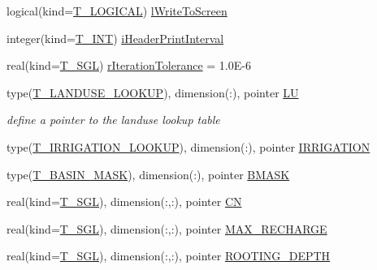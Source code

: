 \begin{DoxyCompactItemize}
logical(kind=\hyperlink{namespacetest_acdeac586276a7d1d394fb5eddc77fc3d}{T\_\-LOGICAL}) \hyperlink{typetest_1_1_t___m_o_d_e_l___c_o_n_f_i_g_u_r_a_t_i_o_n_ad06c7b3ed0928b93d283998b6da8438f}{lWriteToScreen}
\item 
integer(kind=\hyperlink{namespacetest_a6f91ebd89b58cfcc5da99faed9385c1e}{T\_\-INT}) \hyperlink{typetest_1_1_t___m_o_d_e_l___c_o_n_f_i_g_u_r_a_t_i_o_n_a142f03fa1eb88edd013259ce111abdc6}{iHeaderPrintInterval}
\item 
real(kind=\hyperlink{namespacetest_a04d8b9090502de3a00046fe904bc3d99}{T\_\-SGL}) \hyperlink{typetest_1_1_t___m_o_d_e_l___c_o_n_f_i_g_u_r_a_t_i_o_n_aac119edf2f75f0db18a4dc4860cc5c19}{rIterationTolerance} = 1.0E-\/6
\item 
type(\hyperlink{typetest_1_1_t___l_a_n_d_u_s_e___l_o_o_k_u_p}{T\_\-LANDUSE\_\-LOOKUP}), dimension(:), pointer \hyperlink{typetest_1_1_t___m_o_d_e_l___c_o_n_f_i_g_u_r_a_t_i_o_n_a2d94c6dd1c8fee154efbcd35a24f8763}{LU}
\begin{DoxyCompactList}\small\item\em define a pointer to the landuse lookup table \item\end{DoxyCompactList}\item 
type(\hyperlink{typetest_1_1_t___i_r_r_i_g_a_t_i_o_n___l_o_o_k_u_p}{T\_\-IRRIGATION\_\-LOOKUP}), dimension(:), pointer \hyperlink{typetest_1_1_t___m_o_d_e_l___c_o_n_f_i_g_u_r_a_t_i_o_n_a1420e3cbe2e7b347a5519cee404a404e}{IRRIGATION}
\item 
type(\hyperlink{typetest_1_1_t___b_a_s_i_n___m_a_s_k}{T\_\-BASIN\_\-MASK}), dimension(:), pointer \hyperlink{typetest_1_1_t___m_o_d_e_l___c_o_n_f_i_g_u_r_a_t_i_o_n_a0d55d3a1531a2bec8c7187266c9c521d}{BMASK}
\item 
real(kind=\hyperlink{namespacetest_a04d8b9090502de3a00046fe904bc3d99}{T\_\-SGL}), dimension(:,:), pointer \hyperlink{typetest_1_1_t___m_o_d_e_l___c_o_n_f_i_g_u_r_a_t_i_o_n_aa5d2dbec2d279ed153946089830a651e}{CN}
\item 
real(kind=\hyperlink{namespacetest_a04d8b9090502de3a00046fe904bc3d99}{T\_\-SGL}), dimension(:,:), pointer \hyperlink{typetest_1_1_t___m_o_d_e_l___c_o_n_f_i_g_u_r_a_t_i_o_n_ad9308a9326e064d5966e101eac4b3fd7}{MAX\_\-RECHARGE}
\item 
real(kind=\hyperlink{namespacetest_a04d8b9090502de3a00046fe904bc3d99}{T\_\-SGL}), dimension(:,:), pointer \hyperlink{typetest_1_1_t___m_o_d_e_l___c_o_n_f_i_g_u_r_a_t_i_o_n_a5b28e1cecfbed657853ee8f7d1780938}{ROOTING\_\-DEPTH}
\item 

\end{DoxyCompactItemize}
